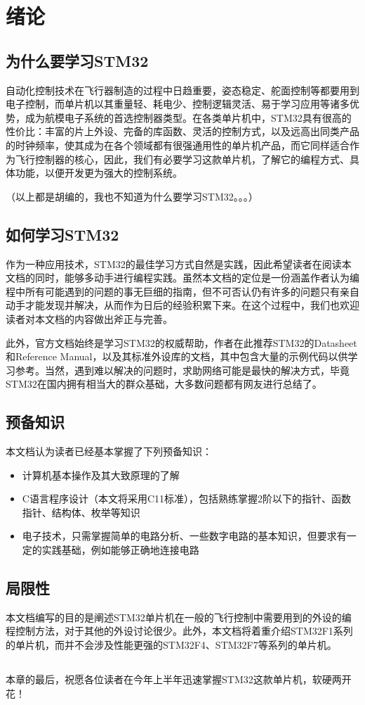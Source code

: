 \setcounter{chapter}{-1}
\chapter{绪论}

\section{为什么要学习STM32}
自动化控制技术在飞行器制造的过程中日趋重要，姿态稳定、舵面控制等都要用到电子控制，而单片机以其重量轻、耗电少、控制逻辑灵活、易于学习应用等诸多优势，成为航模电子系统的首选控制器类型。在各类单片机中，STM32具有很高的性价比：丰富的片上外设、完备的库函数、灵活的控制方式，以及远高出同类产品的时钟频率，使其成为在各个领域都有很强通用性的单片机产品，而它同样适合作为飞行控制器的核心，因此，我们有必要学习这款单片机，了解它的编程方式、具体功能，以便开发更为强大的控制系统。
\par 
（以上都是胡编的，我也不知道为什么要学习STM32。。。）

\section{如何学习STM32}

作为一种应用技术，STM32的最佳学习方式自然是实践，因此希望读者在阅读本文档的同时，能够多动手进行编程实践。虽然本文档的定位是一份涵盖作者认为编程中所有可能遇到的问题的事无巨细的指南，但不可否认仍有许多的问题只有亲自动手才能发现并解决，从而作为日后的经验积累下来。在这个过程中，我们也欢迎读者对本文档的内容做出斧正与完善。

\par 
此外，官方文档始终是学习STM32的权威帮助，作者在此推荐STM32的Datasheet和Reference Manual，以及其标准外设库的文档，其中包含大量的示例代码以供学习参考。当然，遇到难以解决的问题时，求助网络可能是最快的解决方式，毕竟STM32在国内拥有相当大的群众基础，大多数问题都有网友进行总结了。

\section{预备知识}

本文档认为读者已经基本掌握了下列预备知识：
\begin{itemize}
	\item 计算机基本操作及其大致原理的了解
	\item C语言程序设计（本文将采用C11标准），包括熟练掌握2阶以下的指针、函数指针、结构体、枚举等知识
	\item 电子技术，只需掌握简单的电路分析、一些数字电路的基本知识，但要求有一定的实践基础，例如能够正确地连接电路
\end{itemize}

\section{局限性}
本文档编写的目的是阐述STM32单片机在一般的飞行控制中需要用到的外设的编程控制方法，对于其他的外设讨论很少。此外，本文档将着重介绍STM32F1系列的单片机，而并不会涉及性能更强的STM32F4、STM32F7等系列的单片机。

\section*{}
本章的最后，祝愿各位读者在今年上半年迅速掌握STM32这款单片机，软硬两开花！
